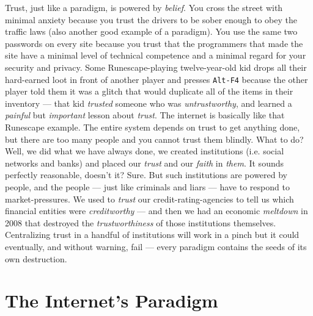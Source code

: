 \documentclass[a4paper]{article}
\begin{document}
Trust, just like a paradigm, is powered by \emph{belief}. You cross
the street with minimal anxiety because you trust the drivers to be
sober enough to obey the traffic laws (also another good example of a
paradigm). You use the same two passwords on every site because you
trust that the programmers that made the site have a minimal level of
technical competence and a minimal regard for your security and privacy.
Some Runescape-playing twelve-year-old kid drops all their hard-earned
loot in front of another player and presses \verb|Alt-F4| because the
other player told them it was a glitch that would duplicate all of the
items in their inventory --- that kid \emph{trusted} someone who was
\emph{untrustworthy}, and learned a \emph{painful} but \emph{
important} lesson about \emph{trust}. The internet is basically like
that Runescape example. The entire system depends on trust to get
anything done, but there are too many people and you cannot trust them
blindly. What to do? Well, we did what we have always done, we created
institutions (i.e. social networks and banks) and placed our \emph{
trust} and our \emph{faith} in \emph{them}. It sounds perfectly
reasonable, doesn't it? Sure. But such institutions are powered by
people, and the people --- just like criminals and liars --- have to
respond to market-pressures. We used to \emph{trust} our
credit-rating-agencies to tell us which financial entities were \emph{
creditworthy} --- and then we had an economic \emph{meltdown} in 2008
that destroyed the \emph{trustworthiness} of those institutions
themselves. Centralizing trust in a handful of institutions will work in
a pinch but it could eventually, and without warning, fail --- every
paradigm contains the seeds of its own destruction.

\section{The Internet's Paradigm}
\end{document}

